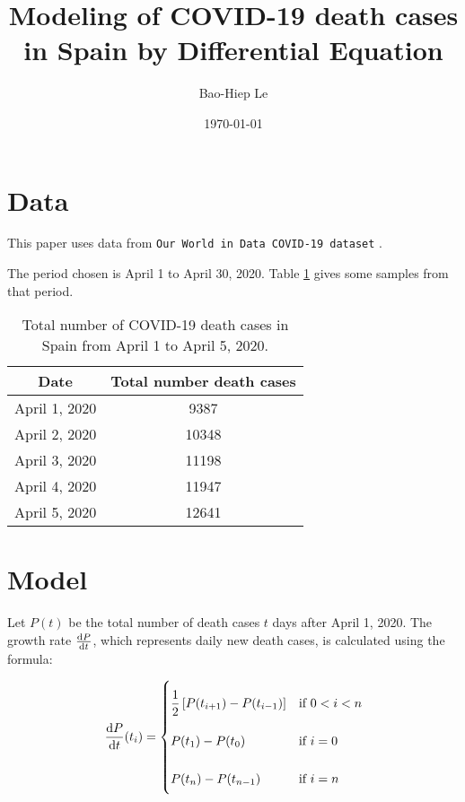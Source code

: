 \documentclass[12pt]{article}
\title{Modeling of COVID-19 death cases in Spain by Differential Equation}
\author{Bao-Hiep Le}
\date{\today}
\begin{document}
\maketitle


\section*{Data}

This paper uses data from \texttt{Our World in Data COVID-19 dataset} \autocite{owid-covid-data}.

The period chosen is April 1 to April 30, 2020. Table \ref{table:1} gives some samples from that period.

\begin{table}[h!]
\centering
\begin{tabular}{ |c|c| }
  \hline
  \textbf{Date} & \textbf{Total number death cases} \\
  \hline
  April 1, 2020 & 9387 \\
  April 2, 2020 & 10348 \\
  April 3, 2020 & 11198 \\
  April 4, 2020 & 11947 \\
  April 5, 2020 & 12641 \\
  \hline
\end{tabular}
\caption{Total number of COVID-19 death cases in Spain from April 1 to April 5, 2020.}
\label{table:1}
\end{table}

\section*{Model}

Let $P(t)$ be the total number of death cases $t$ days after April 1, 2020.
The growth rate $\diff{P}{t}$, which represents daily new death cases,
is calculated using the formula:

\begin{align} \label{rate_formula}
\diff{P}{t}(t_i) =
\renewcommand{\arraystretch}{2.5}\left\{\begin{array}{@{}l@{\quad}l@{}}
  \dfrac{1}{2} \left [ P(t_{i + 1}) - P(t_{i - 1}) \right ] &\text{if } 0 < i < n \\
  P(t_{1}) - P(t_{0}) &\text{if } i = 0 \\
  P(t_{n}) - P(t_{n - 1}) &\text{if } i = n \\
\end{array}\right.\kern-\nulldelimiterspace
\end{align}
\end{document}

